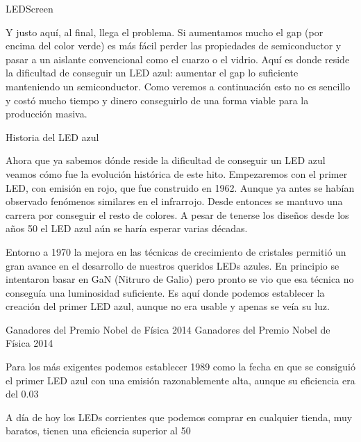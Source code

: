 LEDScreen

Y justo aquí, al final, llega el problema. Si aumentamos mucho el gap (por encima del color verde) es más fácil perder las propiedades de semiconductor y pasar a un aislante convencional como el cuarzo o el vidrio. Aquí es donde reside la dificultad de conseguir un LED azul: aumentar el gap lo suficiente manteniendo un semiconductor. Como veremos a continuación esto no es sencillo y costó mucho tiempo y dinero conseguirlo de una forma viable para la producción masiva.

Historia del LED azul

Ahora que ya sabemos dónde reside la dificultad de conseguir un LED azul veamos cómo fue la evolución histórica de este hito. Empezaremos con el primer LED, con emisión en rojo, que fue construido en 1962. Aunque ya antes se habían observado fenómenos similares en el infrarrojo. Desde entonces se mantuvo una carrera por conseguir el resto de colores. A pesar de tenerse los diseños desde los años 50 el LED azul aún se haría esperar varias décadas.

Entorno a 1970 la mejora en las técnicas de crecimiento de cristales permitió un gran avance en el desarrollo de nuestros queridos LEDs azules. En principio se intentaron basar en GaN (Nitruro de Galio) pero pronto se vio que esa técnica no conseguía una luminosidad suficiente. Es aquí donde podemos establecer la creación del primer LED azul, aunque no era usable y apenas se veía su luz.

Ganadores del Premio Nobel de Física 2014
Ganadores del Premio Nobel de Física 2014

Para los más exigentes podemos establecer 1989 como la fecha en que se consiguió el primer LED azul con una emisión razonablemente alta, aunque su eficiencia era del 0.03%

A día de hoy los LEDs corrientes que podemos comprar en cualquier tienda, muy baratos, tienen una eficiencia superior al 50%

